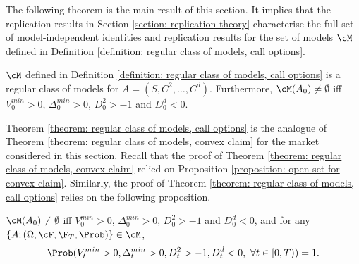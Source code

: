 \documentclass[11pt]{article}
\begin{document}
The following theorem is the main result of this section. It implies that the replication results in Section \ref{section: replication theory} characterise the full set of model-independent identities and replication results for the set of models $\cM$ defined in Definition \ref{definition: regular class of models, call options}.

\begin{theorem}
\label{theorem: regular class of models, call options}
$\cM$ defined in Definition \ref{definition: regular class of models, call options} is a regular class of models for $A = (S,C^2,\ldots,C^d)$. Furthermore, $\cM(A_0) \neq \emptyset$ iff $V^{min}_0 > 0$, $\Delta^{min}_0 > 0$, $D^2_0 > -1$ and $D^d_0 < 0$.
\end{theorem}

Theorem \ref{theorem: regular class of models, call options} is the analogue of Theorem \ref{theorem: regular class of models, convex claim} for the market considered in this section. Recall that the proof of Theorem \ref{theorem: regular class of models, convex claim} relied on 
Proposition \ref{proposition: open set for convex claim}. Similarly, the proof of Theorem \ref{theorem: regular class of models, call options} relies on the following proposition.

\begin{proposition}
\label{proposition: open set for call options}
$\cM(A_0) \neq \emptyset$ iff $V^{min}_0 > 0$, $\Delta^{min}_0 > 0$, $D^2_0 > -1$ and $D^d_0 < 0$, and for any $\{A;(\Omega,\cF,\F_T,\Prob) \} \in \cM$,
$$
\Prob(V^{min}_t > 0, \Delta^{min}_t > 0, D^2_t > -1, D^d_t < 0, \ \forall t \in [0,T) ) = 1.
$$
\end{proposition}
\end{document}
